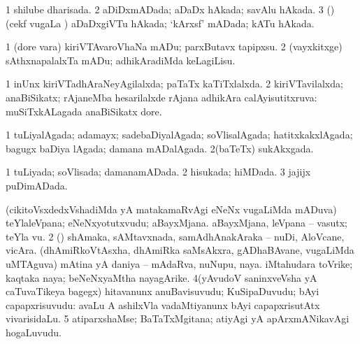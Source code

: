 \bentry
{} 
\gl{\gu}
\expl{}
\bmng
\bnum
\num{1} shilube dharisada. 
\num{2} aDiDxmADada; aDaDx hAkada; savAlu hAkada. 
\num{3} (\birx) (cekf \mo vugaLa \vi) aDaDxgiVTu hAkada; `kArxsf' mADada; kATu hAkada. 
\enum
\emng
\eentry

\bentry
{} 
\gl{\sakirx}
\expl{}
\bmng
\bnum
\num{1} (dore \mo vara) kiriVTAvaroVhaNa mADu; parxButavx tapipxsu. 
\num{2} (vayxkitxge) sAthxnapalalxTa mADu; adhikAradiMda keLagiLisu. 
\enum
\emng
\eentry

\bentry
{} 
\gl{\gu}
\expl{}
\bmng
\bnum
\num{1} inUnx kiriVTadhAraNeyAgilalxda; paTaTx kaTiTxlalxda. 
\num{2} kiriVTavilalxda; anaBiSikatx; rAjaneMba hesarilalxde rAjana adhikAra calAyisutitxruva:  muSiTxkALagada anaBiSikatx dore. 
\enum
\emng
\eentry

\bentry
{} 
\gl{\gu}
\expl{}
\bmng
\bnum
\num{1} tuLiyalAgada; adamayx; sadebaDiyalAgada; soVlisalAgada; hatitxkakxlAgada; bagugx baDiya lAgada; damana mADalAgada. 
\num{2}(baTeTx) sukAkxgada. 
\enum
\emng
\eentry

\bentry
{} 
\gl{\gu}
\expl{}
\bmng
\bnum
\num{1} tuLiyada; soVlisada; damanamADada. 
\num{2} hisukada; hiMDada. 
\num{3} jajijx puDimADada. 
\enum
\emng
\eentry

\bentry
{}
\gl{\saMkiSx}
\expl{}
\bmng
\emng
\eentry

\bentry
{}
\gl{\saMkiSx}
\expl{}
\bmng
\emng
\eentry

\bentry
{} 
\gl{\nA}
\expl{}
\bmng
\bnum
{} 
\banum
{} (cikitoVsxdedxVshadiMda yA matakamaRvAgi eNeNx \mo vugaLiMda mADuva) teYlaleVpana; eNeNxyotutxvudu; aBayxMjana. 
 aBayxMjana, leVpana -- vasutx; teYla \mo vu. 
\eanum
\numie
\num{2} (\rUpa) shAmaka, sAMtavxnada, samAdhAnakAraka -- nuDi, AloVcane, vicAra. 
\banum
{}(dhAmiRkoVtAsxha, dhAmiRka saMsAkxra, gADhaBAvane, \mo vugaLiMda uMTAguva) mAtina yA daniya -- mAdaRva, nuNupu, naya. 
 iMtahudara toVrike; kaqtaka naya; beNeNxyaMtha nayagArike. 
\eanum
\numie
\num{4}(yAvudoV saninxveVsha yA caTuvaTikeya bagegx) hitavanunx anuBavisuvudu; KuSipaDuvudu; bAyi capapxrisuvudu:  avaLu A ashilxVla vadaMtiyanunx bAyi capapxrisutAtx vivarisidaLu. 
\num{5} atiparxshaMse; BaTaTxMgitana; atiyAgi yA apArxmANikavAgi hogaLuvudu. 
\enum
\emng
\eentry

